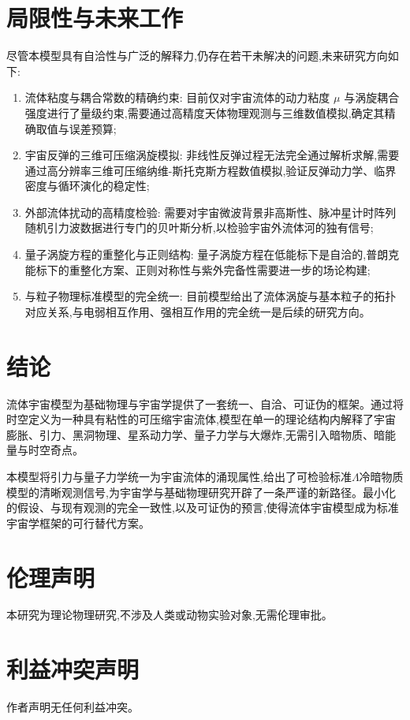 \documentclass[11pt,a4paper]{article}
\begin{document}
\section{局限性与未来工作}
尽管本模型具有自洽性与广泛的解释力,仍存在若干未解决的问题,未来研究方向如下:
\begin{enumerate}
\item 流体粘度与耦合常数的精确约束: 目前仅对宇宙流体的动力粘度 $\mu$ 与涡旋耦合强度进行了量级约束,需要通过高精度天体物理观测与三维数值模拟,确定其精确取值与误差预算;

\item 宇宙反弹的三维可压缩涡旋模拟: 非线性反弹过程无法完全通过解析求解,需要通过高分辨率三维可压缩纳维-斯托克斯方程数值模拟,验证反弹动力学、临界密度与循环演化的稳定性;

\item 外部流体扰动的高精度检验: 需要对宇宙微波背景非高斯性、脉冲星计时阵列随机引力波数据进行专门的贝叶斯分析,以检验宇宙外流体河的独有信号;

\item 量子涡旋方程的重整化与正则结构: 量子涡旋方程在低能标下是自洽的,普朗克能标下的重整化方案、正则对称性与紫外完备性需要进一步的场论构建;

\item 与粒子物理标准模型的完全统一: 目前模型给出了流体涡旋与基本粒子的拓扑对应关系,与电弱相互作用、强相互作用的完全统一是后续的研究方向。
\end{enumerate}

\section{结论}
流体宇宙模型为基础物理与宇宙学提供了一套统一、自洽、可证伪的框架。通过将时空定义为一种具有粘性的可压缩宇宙流体,模型在单一的理论结构内解释了宇宙膨胀、引力、黑洞物理、星系动力学、量子力学与大爆炸,无需引入暗物质、暗能量与时空奇点。

本模型将引力与量子力学统一为宇宙流体的涌现属性,给出了可检验标准$\Lambda$冷暗物质模型的清晰观测信号,为宇宙学与基础物理研究开辟了一条严谨的新路径。最小化的假设、与现有观测的完全一致性,以及可证伪的预言,使得流体宇宙模型成为标准宇宙学框架的可行替代方案。

\section{伦理声明}
本研究为理论物理研究,不涉及人类或动物实验对象,无需伦理审批。

\section{利益冲突声明}
作者声明无任何利益冲突。
\end{document}
